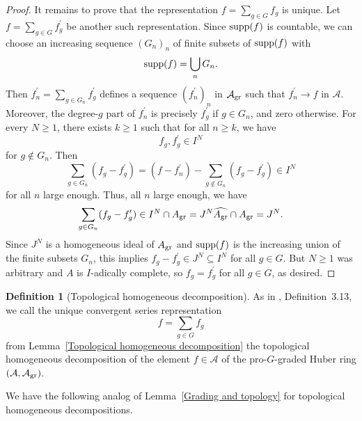 \documentclass[12pt,twoside,a4paper]{article}
\theoremstyle{definition}
\newtheorem{mydef}[thm]{Definition}
\theoremstyle{remark}
\newcommand\gr{{\rm gr}}
\newcommand\supp{{\rm supp}}
\begin{document}
\begin{proof}
It remains to prove that the representation $f=\sum_{g\in G}f_{g}$ is unique. Let $f=\sum_{g\in G}f_{g}^{\prime}$ be another such representation. Since $\supp(f)$ is countable, we can choose an increasing sequence $(G_{n})_{n}$ of finite subsets of $\supp(f)$ with \begin{equation*}\supp(f)=\bigcup_{n}G_{n}.\end{equation*}Then $f_{n}^{\prime}=\sum_{g\in G_{n}}f_{g}^{\prime}$ defines a sequence $(f_{n}^{\prime})_{n}$ in $\mathcal{A}_{\gr}$ such that $f_{n}^{\prime}\to f$ in $\mathcal{A}$. Moreover, the degree-$g$ part of $f_{n}^{\prime}$ is precisely $f_{g}^{\prime}$ if $g\in G_{n}$, and zero otherwise. For every $N\geq1$, there exists $k\geq1$ such that for all $n\geq k$, we have \begin{equation*}f_{g}, f_{g}^{\prime}\in I^{N}\end{equation*}for $g\not\in G_{n}$. Then \begin{equation*}\sum_{g\in G_{n}}(f_{g}-f_{g}^{\prime})=(f-f_{n}^{\prime})-\sum_{g\not\in G_{n}}(f_{g}-f_{g}^{\prime})\in I^{N}\end{equation*}for all $n$ large enough. Thus, all $n$ large enough, we have \begin{equation*}\sum_{g\in G_{n}}(f_{g}-f_{g}^{\prime})\in I^{N}\cap A_{\gr}=J^{N}\widehat{A_{\gr}}\cap A_{\gr}=J^{N}.\end{equation*}Since $J^{N}$ is a homogeneous ideal of $A_{\gr}$ and $\supp(f)$ is the increasing union of the finite subsets $G_{n}$, this implies $f_{g}-f_{g}^{\prime}\in J^{N}\subseteq I^{N}$ for all $g\in G$. But $N\geq1$ was arbitrary and $A$ is $I$-adically complete, so $f_{g}=f_{g}^{\prime}$ for all $g\in G$, as desired. \end{proof}
\begin{mydef}[Topological homogeneous decomposition]\label{Topological homogeneous decomposition, definition}As in \cite{Ishizuka-Yoshikawa25}, Definition~3.13, we call the unique convergent series representation \begin{equation*}f=\sum_{g\in G}f_{g}\end{equation*}from Lemma~\ref{Topological homogeneous decomposition} the topological homogeneous decomposition of the element $f\in \mathcal{A}$ of the pro-$G$-graded Huber ring $(\mathcal{A}, \mathcal{A}_{\gr})$.\end{mydef}
We have the following analog of Lemma~\ref{Grading and topology} for topological homogeneous decompositions.
\end{document}
